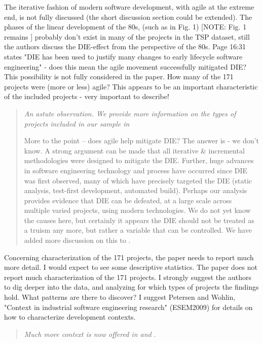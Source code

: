 The iterative fashion of modern software development,
with agile at the extreme end, is not fully discussed (the
short discussion section could be extended). The phases of
the linear development of the 80s, (such as in Fig. 1) [NOTE: Fig. 1 remains ] 
probably don't exist in many of the projects in the TSP
dataset, still the authors discuss the DIE-effect from the
perspective of the 80s. Page 16:31 states "DIE has been used
to justify many changes to early lifecycle software
engineering" - does this mean the agile movement
successfully mitigated DIE? This possibility is not fully
considered in the paper.
How many of the 171 projects were
(more or less) agile? This appears to be an important
characteristic of the included projects - very important to
describe! 

\begin{quote}{\em An astute observation. We provide more information on the types of projects included in our sample in 

More to the point -- does agile help mitigate DIE? The answer is - we don't know. A strong argument can be made that all iterative \& incremental methodologies were designed to mitigate the DIE. Further, huge advances in software engineering technology and process have occurred since DIE was first observed, many of which have precisely targeted the DIE (static analysis, test-first development, automated build). Perhaps our analysis provides evidence that DIE can be defeated, at a large scale across multiple varied projects, using modern technologies. We do not yet know the causes here, but certainly it appears the DIE should not be treated as a truism any more, but rather a variable that can be controlled. We have added more discussion on this to .
}\end{quote}


Concerning characterization of the 171 projects, the
paper needs to report much more detail. I would expect to
see some descriptive statistics.   The paper does not report much
characterization of the 171 projects. I strongly suggest the
authors to dig deeper into the data, and analyzing for which
types of projects the findings hold. What patterns are there
to discover? I suggest Petersen and Wohlin, "Context in
industrial software engineering research" (ESEM2009) for
details on how to characterize development contexts.

\begin{quote}{\em Much more context is now offered in  and }. \end{quote}




